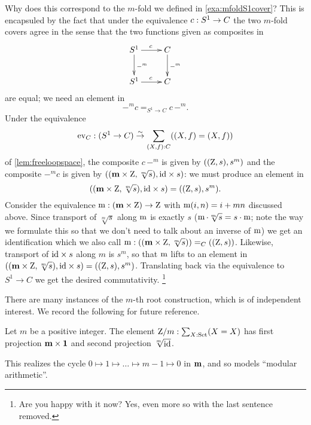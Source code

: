 \begin{example}
Why does this correspond to the $m$-fold \covering we defined in \cref{exa:mfoldS1cover}?  
This is encapsuled by the fact that under the equivalence $c:{S^1}\to C$ the two $m$-fold covers agree in the sense that the two functions given as composites in
$$\xymatrix{\Sc\ar[r]^c\ar[d]^{-^m}&C\ar[d]^{-^m}\\\Sc\ar[r]^c&C}$$ 
are equal; we need an element in
$$-^mc=_{S^1\to C}c\,-^m%
.$$
Under the equivalence 
$$\mathrm{ev}_C:(S^1\to C)\overset\sim\to \sum_{(X,f):C}((X,f)=(X,f))$$ of \cref{lem:freeloopspace}, the composite $c\,-^m$ is given by $((\mathrm{Z},s),s^m)$ 
and the composite $-^mc$ is given by 
$((\mathbf{m}\times\mathrm{Z},\sqrt[m]s),\mathord{\mathrm{id}}\times s)$: we must produce an element in 
$$((\mathbf{m}\times\mathrm{Z},\sqrt[m]s),\mathord{\mathrm{id}}\times s)=((\mathrm{Z},s),s^m).$$
Consider the equivalence  $\mathop{\mathrm{m}}: (\mathbf{m}\times \mathrm{Z})\to\mathrm{Z}$ with $\mathop{\mathrm{m}}(i,n)=i+mn$ discussed above.  Since transport of $\sqrt[m]s$ along $\mathop{\mathrm{m}}$ is exactly $s$ (\ie $\mathop{\mathrm{m}}\cdot\sqrt[m]s=s\cdot\mathop{\mathrm{m}}$; 
note the way we formulate this so that we don't need to talk about an inverse of $\mathop{\mathrm{m}}$) we get an identification which we also call $\mathop{\mathrm{m}}:((\mathbf{m}\times\mathrm{Z},\sqrt[m]s))=_C((\mathrm{Z},s))$.  Likewise, transport of $\mathord{\mathrm{id}}\times s$ along $m$ is $s^m$, so that $\mathop{\mathrm{m}}$ lifts to an element in
$((\mathbf{m}\times\mathrm{Z},\sqrt[m]s),\mathord{\mathrm{id}}\times s)=((\mathrm{Z},s),s^m)$.  Translating back via the equivalence to $S^1\to C$ we get the desired commutativity.
\footnote{Are you happy with it now? Yes, even more so with the last sentence removed. %
}
\end{example}


There are many instances of the $m$-th root construction, which is of independent interest.  
We record the following for future reference.
\begin{definition} \label{def:Zetmodm}
Let $m$ be a positive integer.
The element $\mathrm{Z}/m:\sum_{X:\mathord{\mathrm{Set}}}(X=X)$ has first projection $\mathbf{m}\times\mathbf{1}$ and 
second projection $\sqrt[m]{\mathord{\mathrm{id}}}$.
\end{definition}
\noindent
This realizes the cycle $0\mapsto1\mapsto\dots\mapsto m-1\mapsto 0$ in $\mathbf{m}$, 
and so models ``modular arithmetic''.

